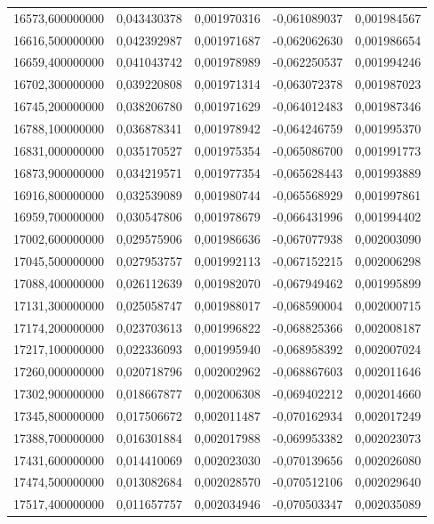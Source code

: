 \begin{longtable}{rrrrr}
16573,600000000 & 0,043430378 & 0,001970316 & -0,061089037 & 0,001984567\\
16616,500000000 & 0,042392987 & 0,001971687 & -0,062062630 & 0,001986654\\
16659,400000000 & 0,041043742 & 0,001978989 & -0,062250537 & 0,001994246\\
16702,300000000 & 0,039220808 & 0,001971314 & -0,063072378 & 0,001987023\\
16745,200000000 & 0,038206780 & 0,001971629 & -0,064012483 & 0,001987346\\
16788,100000000 & 0,036878341 & 0,001978942 & -0,064246759 & 0,001995370\\
16831,000000000 & 0,035170527 & 0,001975354 & -0,065086700 & 0,001991773\\
16873,900000000 & 0,034219571 & 0,001977354 & -0,065628443 & 0,001993889\\
16916,800000000 & 0,032539089 & 0,001980744 & -0,065568929 & 0,001997861\\
16959,700000000 & 0,030547806 & 0,001978679 & -0,066431996 & 0,001994402\\
17002,600000000 & 0,029575906 & 0,001986636 & -0,067077938 & 0,002003090\\
17045,500000000 & 0,027953757 & 0,001992113 & -0,067152215 & 0,002006298\\
17088,400000000 & 0,026112639 & 0,001982070 & -0,067949462 & 0,001995899\\
17131,300000000 & 0,025058747 & 0,001988017 & -0,068590004 & 0,002000715\\
17174,200000000 & 0,023703613 & 0,001996822 & -0,068825366 & 0,002008187\\
17217,100000000 & 0,022336093 & 0,001995940 & -0,068958392 & 0,002007024\\
17260,000000000 & 0,020718796 & 0,002002962 & -0,068867603 & 0,002011646\\
17302,900000000 & 0,018667877 & 0,002006308 & -0,069402212 & 0,002014660\\
17345,800000000 & 0,017506672 & 0,002011487 & -0,070162934 & 0,002017249\\
17388,700000000 & 0,016301884 & 0,002017988 & -0,069953382 & 0,002023073\\
17431,600000000 & 0,014410069 & 0,002023030 & -0,070139656 & 0,002026080\\
17474,500000000 & 0,013082684 & 0,002028570 & -0,070512106 & 0,002029640\\
17517,400000000 & 0,011657757 & 0,002034946 & -0,070503347 & 0,002035089\\

\end{longtable}
